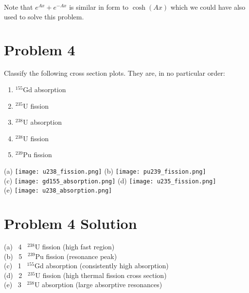 \documentclass{report}
\begin{document}
Note that $e^{Ax} + e^{-Ax}$ is similar in form to $\cosh(Ax)$ which we could have also used to solve this problem.



\newpage
\section*{Problem 4}

Classify the following cross section plots. They are, in no particular order:
\begin{enumerate}[(1)]
\item $^{155}$Gd absorption
\item $^{235}$U fission
\item $^{238}$U absorption
\item $^{238}$U fission
\item $^{239}$Pu fission
\end{enumerate}

(a) \texttt{[image: u238\_fission.png]}
(b) \texttt{[image: pu239\_fission.png]} \\
(c) \texttt{[image: gd155\_absorption.png]}
(d) \texttt{[image: u235\_fission.png]}\\
(e) \texttt{[image: u238\_absorption.png]}



\section*{Problem 4 Solution}


\tab\tab (a) \, 4 \, $^{238}$U fission (high fast region) 					\\
\tab\tab (b) \, 5 \, $^{239}$Pu fission (resonance peak)					\\
\tab\tab (c) \, 1 \, $^{155}$Gd absorption (consistently high absorption)	\\
\tab\tab (d) \, 2 \, $^{235}$U fission (high thermal fission cross section)	\\
\tab\tab (e) \, 3 \, $^{238}$U absorption (large absorptive resonances)
\end{document}
